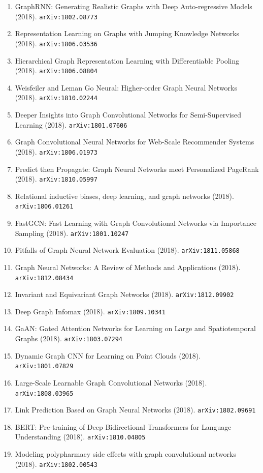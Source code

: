 \documentclass[11pt]{article}
\begin{document}
\begin{enumerate}
  \item GraphRNN: Generating Realistic Graphs with Deep Auto-regressive Models (2018). \texttt{arXiv:1802.08773}
  \item Representation Learning on Graphs with Jumping Knowledge Networks (2018). \texttt{arXiv:1806.03536}
  \item Hierarchical Graph Representation Learning with Differentiable Pooling (2018). \texttt{arXiv:1806.08804}
  \item Weisfeiler and Leman Go Neural: Higher-order Graph Neural Networks (2018). \texttt{arXiv:1810.02244}
  \item Deeper Insights into Graph Convolutional Networks for Semi-Supervised
  Learning (2018). \texttt{arXiv:1801.07606}
  \item Graph Convolutional Neural Networks for Web-Scale Recommender Systems (2018). \texttt{arXiv:1806.01973}
  \item Predict then Propagate: Graph Neural Networks meet Personalized PageRank (2018). \texttt{arXiv:1810.05997}
  \item Relational inductive biases, deep learning, and graph networks (2018). \texttt{arXiv:1806.01261}
  \item FastGCN: Fast Learning with Graph Convolutional Networks via Importance
  Sampling (2018). \texttt{arXiv:1801.10247}
  \item Pitfalls of Graph Neural Network Evaluation (2018). \texttt{arXiv:1811.05868}
  \item Graph Neural Networks: A Review of Methods and Applications (2018). \texttt{arXiv:1812.08434}
  \item Invariant and Equivariant Graph Networks (2018). \texttt{arXiv:1812.09902}
  \item Deep Graph Infomax (2018). \texttt{arXiv:1809.10341}
  \item GaAN: Gated Attention Networks for Learning on Large and Spatiotemporal
  Graphs (2018). \texttt{arXiv:1803.07294}
  \item Dynamic Graph CNN for Learning on Point Clouds (2018). \texttt{arXiv:1801.07829}
  \item Large-Scale Learnable Graph Convolutional Networks (2018). \texttt{arXiv:1808.03965}
  \item Link Prediction Based on Graph Neural Networks (2018). \texttt{arXiv:1802.09691}
  \item BERT: Pre-training of Deep Bidirectional Transformers for Language
  Understanding (2018). \texttt{arXiv:1810.04805}
  \item Modeling polypharmacy side effects with graph convolutional networks (2018). \texttt{arXiv:1802.00543}

\end{enumerate}
\end{document}
